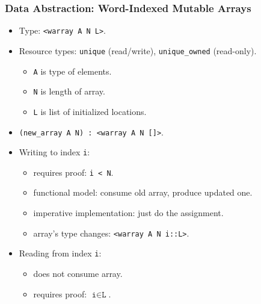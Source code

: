 \documentclass[10pt]{beamer}
\begin{document}
\begin{frame}
\frametitle{Data Abstraction: Word-Indexed Mutable Arrays}

\begin{itemize}
\item Type: \texttt{<warray A N L>}.
\item Resource types: \texttt{unique} (read/write), \texttt{unique\_owned} (read-only).
\begin{itemize}
\item \texttt{A} is type of elements.
\item \texttt{N} is length of array.
\item \texttt{L} is list of initialized locations.
\end{itemize}

\item \texttt{(new\_array A N) : <warray A N []>}.

\item Writing to index \texttt{i}: 
\begin{itemize}
\item requires proof: \texttt{i < N}.
\item functional model: consume old array, produce updated one.
\item imperative implementation: just do the assignment.
\item array's type changes:  \texttt{<warray A N i::L>}.
\end{itemize}

\item Reading from index \texttt{i}:
\begin{itemize}
\item does not consume array.
\item requires proof: $\texttt{i}\in\texttt{L}$.
\end{itemize}
\end{itemize}
\end{frame}
\end{document}
